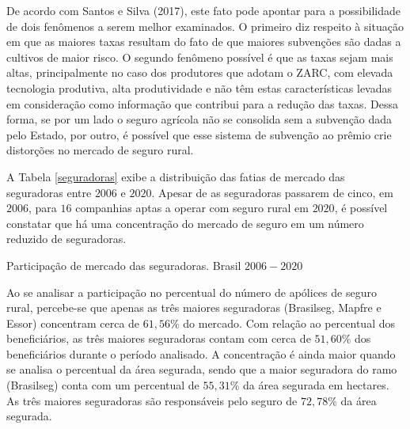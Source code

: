 De acordo com  Santos e Silva (2017), este fato pode apontar para a possibilidade de dois fenômenos a serem melhor examinados. O primeiro diz respeito à situação em que as maiores taxas resultam do fato de que maiores subvenções são dadas a cultivos de maior risco. O segundo fenômeno possível é que as taxas sejam mais altas, principalmente no caso dos produtores que adotam o ZARC, com elevada tecnologia produtiva, alta produtividade e não têm estas características levadas em consideração como informação que contribui para a redução das taxas. Dessa forma, se por um lado o seguro agrícola não se consolida sem a subvenção dada pelo Estado, por outro, é possível que esse sistema de subvenção ao prêmio crie distorções no mercado de seguro rural. 


A Tabela \ref{seguradoras} exibe a distribuição das fatias de mercado das seguradoras entre $2006$ e $2020$. Apesar de as seguradoras passarem de cinco, em $2006$, para $16$ companhias aptas a operar com seguro rural em $2020$, é possível constatar que há uma concentração do mercado de seguro em um número reduzido de seguradoras. 

\begin{small}
\begin{table}[H]
\caption{Participação de mercado das seguradoras. Brasil $2006-2020$}\label{seguradoras}
 
\end{table}
\end{small}

Ao se analisar a participação no percentual do número de apólices de seguro rural, percebe-se que apenas as três maiores seguradoras (Brasilseg, Mapfre e Essor) concentram cerca de $61,56\%$ do mercado. Com relação ao percentual dos beneficiários, as três maiores seguradoras contam com cerca de $51,60\%$ dos beneficiários durante o período analisado. A concentração é ainda maior quando se analisa o percentual da área segurada, sendo que a  maior seguradora do ramo (Brasilseg) conta com um percentual de $55,31\%$ da área segurada em hectares. As três maiores seguradoras são responsáveis pelo seguro de $72,78\%$ da área segurada. 


